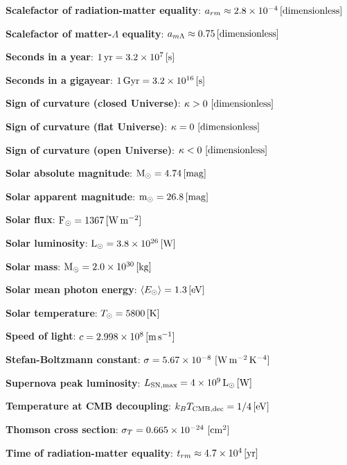 \documentclass[a4paper,11pt]{article}
\begin{document}
{\noindent}\textbf{Scalefactor of radiation-matter equality}: $a_{rm} \approx 2.8\times10^{-4}\,[{\rm dimensionless}]$

{\noindent}\textbf{Scalefactor of matter-$\Lambda$ equality}: $a_{m\Lambda}
\approx0.75\,[{\rm dimensionless}]$

{\noindent}\textbf{Seconds in a year}: $1\,{\rm yr} = 3.2\times10^7\,[{\rm s}]$

{\noindent}\textbf{Seconds in a gigayear}: $1\,{\rm Gyr} = 3.2\times10^{16}\,[{\rm s}]$

{\noindent}\textbf{Sign of curvature (closed Universe)}: $\kappa>0 ~ [{\rm dimensionless}]$

{\noindent}\textbf{Sign of curvature (flat Universe)}: $\kappa=0 ~ [{\rm dimensionless}]$

{\noindent}\textbf{Sign of curvature (open Universe)}: $\kappa<0 ~ [{\rm dimensionless}]$

{\noindent}\textbf{Solar absolute magnitude}: ${\rm M}_\odot = 4.74\,[{\rm mag}]$

{\noindent}\textbf{Solar apparent magnitude}: ${\rm m}_\odot = 26.8\,[{\rm mag}]$

{\noindent}\textbf{Solar flux}: ${\rm F}_\odot = 1367\,[{\rm W\,m^{-2}}]$

{\noindent}\textbf{Solar luminosity}: ${\rm L}_\odot = 3.8\times10^{26}\,[{\rm W}]$

{\noindent}\textbf{Solar mass}: ${\rm M}_\odot = 2.0\times10^{30}\,[{\rm kg}]$

{\noindent}\textbf{Solar mean photon energy}: $\langle E_\odot \rangle = 1.3\,[{\rm eV}]$

{\noindent}\textbf{Solar temperature}: $T_\odot = 5800\,[{\rm K}]$

{\noindent}\textbf{Speed of light}: $c=2.998\times10^8\,[{\rm m\,s^{-1}}]$

{\noindent}\textbf{Stefan-Boltzmann constant}: $\sigma=5.67\times10^{-8} ~ [{\rm W\,m^{-2}\,K^{-4}}]$

{\noindent}\textbf{Supernova peak luminosity}: $L_\mathrm{SN,max} = 4\times10^9\,{\rm L_\odot}\,[{\rm W}]$

{\noindent}\textbf{Temperature at CMB decoupling}: $k_BT_\mathrm{CMB,dec} = 1/4\,[{\rm eV}]$

{\noindent}\textbf{Thomson cross section}: $\sigma_T=0.665\times10^{-24} ~ [{\rm cm^2}]$

{\noindent}\textbf{Time of radiation-matter equality}: $t_{rm} \approx 4.7\times10^{4}\,[{\rm yr}]$
\end{document}
